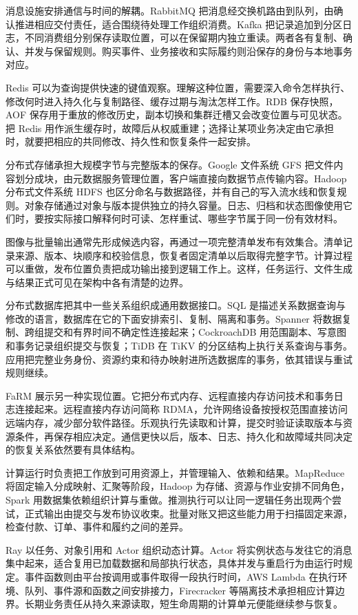 消息设施安排通信与时间的解耦。RabbitMQ 把消息经交换机路由到队列，由确认推进相应交付责任，适合围绕待处理工作组织消费。Kafka 把记录追加到分区日志，不同消费组分别保存读取位置，可以在保留期内独立重读。两者各有复制、确认、并发与保留规则。购买事件、业务接收和实际履约则沿保存的身份与本地事务对应。

Redis 可以为查询提供快速的键值观察。理解这种位置，需要深入命令怎样执行、修改何时进入持久化与复制路径、缓存过期与淘汰怎样工作。RDB 保存快照，AOF 保存用于重放的修改历史，副本切换和集群迁槽又会改变位置与可见状态。把 Redis 用作派生缓存时，故障后从权威重建；选择让某项业务决定由它承担时，就要把相应的共同修改、持久性和恢复条件一起安排。

分布式存储承担大规模字节与完整版本的保存。Google 文件系统 GFS 把文件内容划分成块，由元数据服务管理位置，客户端直接向数据节点传输内容。Hadoop 分布式文件系统 HDFS 也区分命名与数据路径，并有自己的写入流水线和恢复规则。对象存储通过对象与版本提供独立的持久容量。日志、归档和状态图像使用它们时，要按实际接口解释何时可读、怎样重试、哪些字节属于同一份有效材料。

图像与批量输出通常先形成候选内容，再通过一项完整清单发布有效集合。清单记录来源、版本、块顺序和校验信息，恢复者固定清单以后取得完整字节。计算过程可以重做，发布位置负责把成功输出接到逻辑工作上。这样，任务运行、文件生成与结果正式可见在架构中各有清楚的边界。

分布式数据库把其中一些关系组织成通用数据接口。SQL 是描述关系数据查询与修改的语言，数据库在它的下面安排索引、复制、隔离和事务。Spanner 将数据复制、跨组提交和有界时间不确定性连接起来；CockroachDB 用范围副本、写意图和事务记录组织提交与恢复；TiDB 在 TiKV 的分区结构上执行关系查询与事务。应用把完整业务身份、资源约束和待办映射进所选数据库的事务，依其错误与重试规则继续。

FaRM 展示另一种实现位置。它把分布式内存、远程直接内存访问技术和事务日志连接起来。远程直接内存访问简称 RDMA，允许网络设备按授权范围直接访问远端内存，减少部分软件路径。乐观执行先读取和计算，提交时验证读取版本与资源条件，再保存相应决定。通信更快以后，版本、日志、持久化和故障域共同决定的恢复关系依然要有具体结构。

计算运行时负责把工作放到可用资源上，并管理输入、依赖和结果。MapReduce 将固定输入分成映射、汇聚等阶段，Hadoop 为存储、资源与作业安排不同角色，Spark 用数据集依赖组织计算与重做。推测执行可以让同一逻辑任务出现两个尝试，正式输出由提交与发布协议收束。批量对账又把这些能力用于扫描固定来源，检查付款、订单、事件和履约之间的差异。

Ray 以任务、对象引用和 Actor 组织动态计算。Actor 将实例状态与发往它的消息集中起来，适合复用已加载数据和局部执行状态，具体并发与重启行为由运行时规定。事件函数则由平台按调用或事件取得一段执行时间，AWS Lambda 在执行环境、队列、事件源和函数之间安排接力，Firecracker 等隔离技术承担相应计算边界。长期业务责任从持久来源读取，短生命周期的计算单元便能继续参与恢复。

